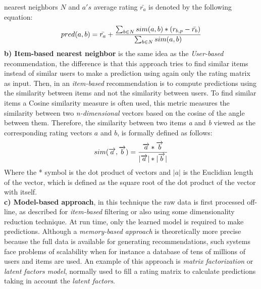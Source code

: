 nearest neighbors $N$ and $a's$ average rating $\bar{r_a}$ is denoted
by the following equation:
\begin{equation}\label{eq:prediction}
\displaystyle pred(a,b) = \bar{r_a} + 
{\sum_{b \in N} sim(a,b) * (r_{b,p}- \bar{r_b}) 
\over \sum_{b \in N} sim(a,b)} 
\end{equation}
\textbf{b) Item-based nearest neighbor} is the same idea as the \textit
{User-based} recommendation, the difference is that this approach tries to find
similar items instead of similar users to make a prediction using again only the rating
matrix as input. Then, in an \textit{item-based} recommendation is to compute
predictions using the similarity between items and not the similarity
between users. To find similar items a Cosine similarity measure is often used,
this metric measures the similarity between two
\textit{n-dimensional} vectors based on the cosine of the angle between them.
Therefore, the similarity between two items \textit{a} and \textit{b}
viewed as the corresponding rating vectors $a$ and $b$, is formally
defined as follows:
\begin{equation}\label{eq:cosine}
\displaystyle sim(\overrightarrow{a},\overrightarrow{b})= 
{\overrightarrow{a}* \overrightarrow{b} \over
|\overrightarrow{a}|*|\overrightarrow{b}| }
\end{equation}
Where the * symbol is the dot product of vectors and $|a|$ is the Euclidian
length of the vector, which is defined as the square root of the dot
product of the vector with itself.\\

\textbf{c) Model-based approach}, in this technique the raw data is
first processed off-line, as described for \textit {item-based}
filtering or also using some dimensionality reduction technique. At run time,
only the learned model is required to make predictions. Although a
\textit{memory-based approach} is theoretically more precise because
the full data is available for generating recommendations, such systems
face problems of scalability when for instance a database of tens of millions of
users and items are used. An example of this approach is
\textit{matrix factorization} or \textit{latent factors model},
normally used to fill a rating matrix to calculate predictions taking
in account the \textit{latent factors}.

